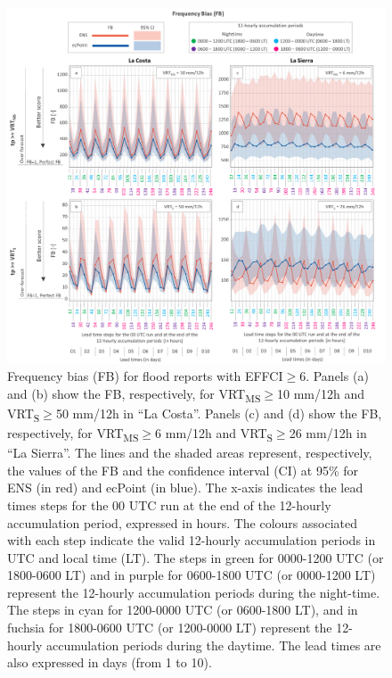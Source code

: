 \documentclass[techmemo]{ecmwfrep}%
\begin{document}
\begin{figure}
\centering
\includegraphics[width=\textwidth]{Figures/12_RESULTS_FB.png}
\caption{Frequency bias (FB) for flood reports with EFFCI$\geq$6. Panels (a) and (b) show the FB, respectively, for VRT\textsubscript{MS}$\geq$10 mm/12h and VRT\textsubscript{S}$\geq$50 mm/12h in “La Costa”. Panels (c) and (d) show the FB, respectively, for VRT\textsubscript{MS}$\geq$6 mm/12h and VRT\textsubscript{S}$\geq$26 mm/12h in “La Sierra”. The lines and the shaded areas represent, respectively, the values of the FB and the confidence interval (CI) at 95\% for ENS (in red) and ecPoint (in blue). The x-axis indicates the lead times steps for the 00 UTC run at the end of the 12-hourly accumulation period, expressed in hours. The colours associated with each step indicate the valid 12-hourly accumulation periods in UTC and local time (LT). The steps in green for 0000-1200 UTC (or 1800-0600 LT) and in purple for 0600-1800 UTC (or 0000-1200 LT) represent the 12-hourly accumulation periods during the night-time. The steps in cyan for 1200-0000 UTC (or 0600-1800 LT), and in fuchsia for 1800-0600 UTC (or 1200-0000 LT) represent the 12-hourly accumulation periods during the daytime. The lead times are also expressed in days (from 1 to 10).}
\label{fig:FB}
\end{figure}
\end{document}
